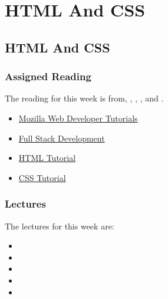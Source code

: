 \clearpage

\renewcommand{\ChapTitle}{HTML And CSS}
\renewcommand{\SectionTitle}{HTML And CSS}

\chapter{\ChapTitle}

\section{\SectionTitle}

\subsection{Assigned Reading}

The reading for this week is from, \AgileBook, \EngSoftBook, \ProGitBook, and \LinuxBook.

\begin{itemize}
    \item \href{https://developer.mozilla.org/en-US/docs/Learn}{Mozilla Web Developer Tutorials}
    \item \href{https://medium.com/coderbyte/a-guide-to-becoming-a-full-stack-developer-in-2017-5c3c08a1600c}{Full Stack Development}
    \item \href{https://www.tutorialspoint.com/html/index.htm}{HTML Tutorial}
    \item \href{https://www.w3schools.com/css/default.asp}{CSS Tutorial}
\end{itemize}

\subsection{Lectures}

The lectures for this week are:

\begin{itemize}
    \item {}
    \item {}
    \item {}
    \item {}
    \item {}
\end{itemize}

